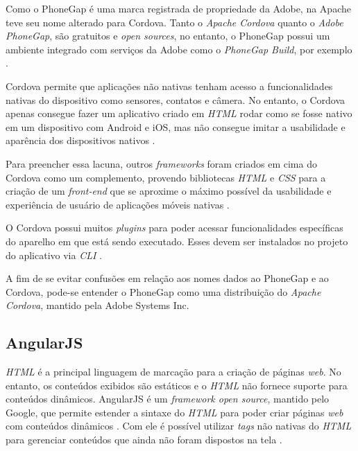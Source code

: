Como o PhoneGap é uma marca registrada de propriedade da Adobe, na Apache teve seu nome alterado para Cordova.
Tanto o \textit{Apache Cordova} quanto o \textit{Adobe PhoneGap}, são gratuitos e \textit{open sources}, no entanto, o 
PhoneGap possui um ambiente integrado com serviços da Adobe como o \textit{PhoneGap Build}, por exemplo \cite{bezerra_desenvolvimento_2016}.
 
Cordova permite que aplicações não nativas tenham acesso a funcionalidades nativas do dispositivo como sensores, 
contatos e câmera. No entanto, o Cordova apenas consegue fazer um aplicativo criado em 
\textit{HTML} rodar como se fosse nativo em um dispositivo com Android e iOS, mas não consegue 
imitar a usabilidade e aparência dos dispositivos nativos \cite{bezerra_desenvolvimento_2016}. 

Para preencher essa lacuna, outros \textit{frameworks} foram criados em cima do Cordova como um complemento, 
provendo bibliotecas \textit{HTML} e \textit{CSS} para a 
criação de um \textit{front-end} que se aproxime o máximo possível da usabilidade e experiência de usuário de 
aplicações móveis nativas \cite{bezerra_desenvolvimento_2016}.

O Cordova possui muitos \textit{plugins} para poder acessar funcionalidades específicas do aparelho em que está sendo 
executado. Esses devem ser instalados no projeto do aplicativo via \textit{CLI} \cite{bezerra_desenvolvimento_2016}. 

A fim de se evitar confusões em relação aos nomes dados ao PhoneGap e ao Cordova, pode-se entender o PhoneGap 
como uma distribuição do \textit{Apache Cordova}, mantido pela Adobe Systems Inc. 



\subsection{AngularJS} \label{subsection:angularjs}

\textit{HTML} é a principal linguagem de marcação para a criação de páginas \textit{web}. No entanto, os conteúdos 
exibidos são estáticos e o \textit{HTML} não fornece suporte para conteúdos dinâmicos.
AngularJS é um \textit{framework open source}, mantido pelo Google, que permite estender a sintaxe do 
\textit{HTML} para poder criar páginas \textit{web} com conteúdos dinâmicos \cite{bezerra_desenvolvimento_2016}. Com ele é possível utilizar \textit{tags} 
não nativas do \textit{HTML} para gerenciar conteúdos que ainda não 
foram dispostos na tela \cite{google_angularjs_2016}.

